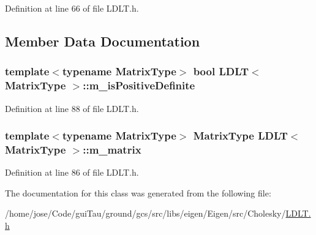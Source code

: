 Definition at line 66 of file L\-D\-L\-T.\-h.



\subsection{Member Data Documentation}
\hypertarget{class_l_d_l_t_a08fa6d5609b8fe4b18f4af11d0bec528}{
\subsubsection[{m\-\_\-is\-Positive\-Definite}]{\setlength{\rightskip}{0pt plus 5cm}template$<$typename Matrix\-Type$>$ bool {\bf L\-D\-L\-T}$<$ Matrix\-Type $>$\-::m\-\_\-is\-Positive\-Definite\hspace{0.3cm}{\ttfamily [protected]}}}\label{class_l_d_l_t_a08fa6d5609b8fe4b18f4af11d0bec528}


Definition at line 88 of file L\-D\-L\-T.\-h.

\hypertarget{class_l_d_l_t_a48764c71819c18ade7a5dd06af9b3936}{
\subsubsection[{m\-\_\-matrix}]{\setlength{\rightskip}{0pt plus 5cm}template$<$typename Matrix\-Type$>$ Matrix\-Type {\bf L\-D\-L\-T}$<$ Matrix\-Type $>$\-::m\-\_\-matrix\hspace{0.3cm}{\ttfamily [protected]}}}\label{class_l_d_l_t_a48764c71819c18ade7a5dd06af9b3936}


Definition at line 86 of file L\-D\-L\-T.\-h.



The documentation for this class was generated from the following file\-:\begin{DoxyCompactItemize}
\item 
/home/jose/\-Code/gui\-Tau/ground/gcs/src/libs/eigen/\-Eigen/src/\-Cholesky/\hyperlink{_l_d_l_t_8h}{L\-D\-L\-T.\-h}\end{DoxyCompactItemize}
